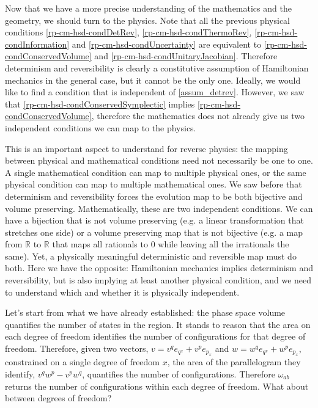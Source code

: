 Now that we have a more precise understanding of the mathematics and the geometry, we should turn to the physics. Note that all the previous physical conditions \ref{rp-cm-hsd-condDetRev}, \ref{rp-cm-hsd-condThermoRev}, \ref{rp-cm-hsd-condInformation} and \ref{rp-cm-hsd-condUncertainty} are equivalent to \ref{rp-cm-hsd-condConservedVolume} and \ref{rp-cm-hsd-condUnitaryJacobian}. Therefore determinism and reversibility is clearly a constitutive assumption of Hamiltonian mechanics in the general case, but it cannot be the only one. Ideally, we would like to find a condition that is independent of \ref{assum_detrev}. However, we saw that \ref{rp-cm-hsd-condConservedSymplectic} implies \ref{rp-cm-hsd-condConservedVolume}, therefore the mathematics does not already give us two independent conditions we can map to the physics.

This is an important aspect to understand for reverse physics: the mapping between physical and mathematical conditions need not necessarily be one to one. A single mathematical condition can map to multiple physical ones, or the same physical condition can map to multiple mathematical ones. We saw before that determinism and reversibility forces the evolution map to be both bijective and volume preserving. Mathematically, these are two independent conditions. We can have a bijection that is not volume preserving (e.g. a linear transformation that stretches one side) or a volume preserving map that is not bijective (e.g. a map from $\mathbb{R}$ to $\mathbb{R}$ that maps all rationals to $0$ while leaving all the irrationals the same). Yet, a physically meaningful deterministic and reversible map must do both. Here we have the opposite: Hamiltonian mechanics implies determinism and reversibility, but is also implying at least another physical condition, and we need to understand which and whether it is physically independent.

Let's start from what we have already established: the phase space volume quantifies the number of states in the region. It stands to reason that the area on each degree of freedom identifies the number of configurations for that degree of freedom. Therefore, given two vectors, $v = v^q e_{q^x} + v^p e_{p_x}$ and $w = w^q e_{q^x} + w^p e_{p_x}$, constrained on a single degree of freedom $x$, the area of the parallelogram they identify, $v^q w^p - v^p w^q$, quantifies the number of configurations. Therefore $\omega_{ab}$ returns the number of configurations within each degree of freedom. What about between degrees of freedom?

